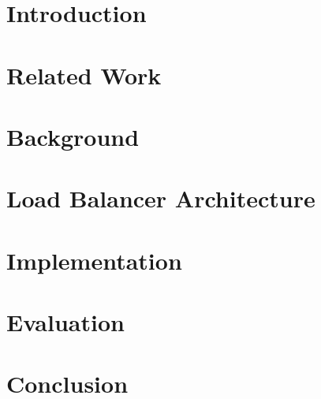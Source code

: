 
\chapter{Introduction}\label{chapter:introduction}
\graphicspath{{Manuscript/}}


\chapter{Related Work}\label{chapter:related}
\graphicspath{{Manuscript/}}


\chapter{Background}\label{chapter:background}
\graphicspath{{Manuscript/}}


\chapter{Load Balancer Architecture}\label{chapter:proposed}
\graphicspath{{Manuscript/}}


\chapter{Implementation}\label{chapter:implemetation}
\graphicspath{{Manuscript/}}


\chapter{Evaluation}\label{chapter:evaluation}
\graphicspath{{Manuscript/}}


\chapter{Conclusion}\label{chapter:conclusion}
\graphicspath{{Manuscript/}}


